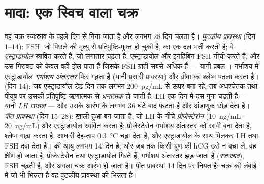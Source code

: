 \section{मादा: एक स्विच वाला चक्र}

\begin{definition}[अंडाशयी और गर्भाशयी चक्र]\label{def:b2:reproductive-hormones:cycle}
वह चक्र रजःस्राव के पहले दिन से गिना जाता है और लगभग 28 दिन चलता है।
\emph{पुटकीय प्रावस्था} (दिन 1--14): FSH, जो पिछले  की
मृत्यु से प्रतिपुष्टि-मुक्त हो चुकी है,  का एक दल भर्ती
करती है; वे \emph{एस्ट्राडायोल} स्रावित करते हैं, जो लगातार चढ़ता है;
एस्ट्राडायोल और इनहिबिन FSH नीची करते हैं, और उस गिरावट को केवल वही
 झेल पाता है जिसके FSH ग्राही सबसे अधिक हैं --- यानी प्रबल ।
गर्भाशय में एस्ट्राडायोल \emph{गर्भाशय अंतःस्तर} फिर गढ़ता है (यानी
प्रसारी प्रावस्था) और ग्रीवा का श्लेष्म पतला करता है। \emph{}
(दिन 14): जब एस्ट्राडायोल डेढ़ दिन तक लगभग \qty{200}{pg/mL} से ऊपर बना
रहे, तब अधश्चेतक तथा पीयूष पर उसकी प्रतिपुष्टि
ऋणात्मक से \emph{धनात्मक} हो जाती है; LH एक दिन में दस गुना चढ़ती है
--- यानी \emph{LH उछाल} --- और उसके आरंभ के लगभग 36 घंटे बाद
 फटता है और अंडाणुक छोड़ देता है। \emph{पीत प्रावस्था} (दिन
15--28): ख़ाली हुआ   बन जाता है, जो
LH के नीचे \emph{प्रोजेस्टेरोन} (\qtyrange{10}{20}{ng/mL}) और
एस्ट्राडायोल स्रावित करता है; प्रोजेस्टेरोन गर्भाशय अंतःस्तर को स्रावी
बना देता है, श्लेष्म गाढ़ा करता है, आधारी देह-ताप \qty{0.3}{\celsius}
चढ़ा देता है, और एस्ट्राडायोल के साथ मिलकर LH तथा FSH दबा देता है।
 की आयु लगभग 14 दिन है; और जब तक किसी भ्रूण की hCG उसे न बचा
ले, वह क्षीण हो जाता है, प्रोजेस्टेरोन तथा एस्ट्राडायोल गिरते हैं,
गर्भाशय अंतःस्तर झड़ जाता है (\emph{रजःस्राव}), FSH चढ़ती है, और अगला
चक्र आरंभ हो जाता है। पीत प्रावस्था 14 दिन पर नियत है; चक्र की लंबाई
में जो भी भिन्नता है वह पुटकीय प्रावस्था की भिन्नता है।
\end{definition}

